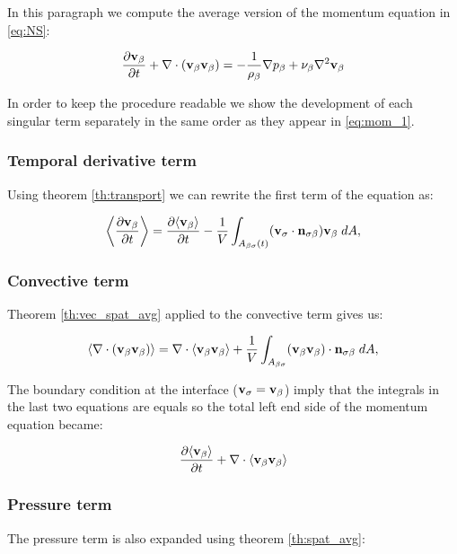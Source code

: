 In this paragraph we compute the average version of the momentum equation in \eqref{eq:NS}:

\begin{equation}
\dfrac{\partial \textbf{v}_{\beta}}{\partial t} + \nabla \cdot (\textbf{v}_{\beta}\textbf{v}_{\beta}) = -\frac{1}{\rho_{\beta}} \nabla p_{\beta} + \nu_{\beta} \nabla^2  \textbf{v}_{\beta}
\label{eq:mom_1}
\end{equation}

In order to keep the procedure readable we show the development of each singular term separately in the same order as they appear in \eqref{eq:mom_1}.

\subsubsection{Temporal derivative term}

Using theorem \ref{th:transport} we can rewrite the first term of the equation as:

\begin{equation}
{\left< \dfrac{\partial \textbf{v}_{\beta}}{\partial t} \right>} = \dfrac{\partial {\left< \textbf{v}_{\beta}\right>}}{\partial t} -\dfrac{1}{V} \int_{A_{\beta \sigma}(t)} (\textbf{v}_{\sigma} \cdot \mathbf{n}_{\sigma \beta} ) \textbf{v}_{\beta} \;dA,
\end{equation}

\subsubsection{Convective term}

Theorem \ref{th:vec_spat_avg} applied to the convective term gives us:

\begin{equation}
{\left< \nabla \cdot (\textbf{v}_{\beta}\textbf{v}_{\beta}) \right>} = \nabla \cdot {\left< \textbf{v}_{\beta}\textbf{v}_{\beta}\right>} + \dfrac{1}{V} \int_{A_{\beta \sigma}}  (\textbf{v}_{\beta} \textbf{v}_{\beta}) \cdot \mathbf{n}_{\sigma \beta} \;dA,
\end{equation}

The boundary condition at the interface ($\textbf{v}_{\sigma} = \textbf{v}_{\beta}$) imply that the integrals in the last two equations are equals so the total left end side of the momentum equation became:

\begin{equation}
\dfrac{\partial {\left< \textbf{v}_{\beta}\right>}}{\partial t} + \nabla \cdot {\left< \textbf{v}_{\beta}\textbf{v}_{\beta}\right>}
\label{eq:lhs}
\end{equation}

\subsubsection{Pressure term}
The pressure term is also expanded using theorem \ref{th:spat_avg}:

